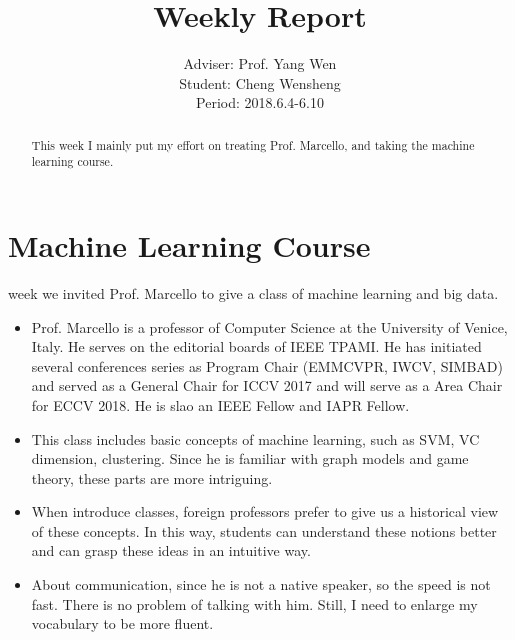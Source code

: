 \documentclass[]{IEEEtran}
\begin{document}
	\title{Weekly Report}
	\author{Adviser: Prof. Yang Wen \\Student: Cheng Wensheng\\ Period: 2018.6.4-6.10
	}
	\maketitle

\begin{abstract}
	This week I mainly put my effort on treating Prof. Marcello, and taking the machine learning course.
\end{abstract}

\section{Machine Learning Course}
	 week we invited Prof. Marcello to give a class of machine learning and big data.
	\begin{itemize}
		\item Prof. Marcello is a professor of Computer Science at the University of Venice, Italy. He serves on the editorial boards of IEEE TPAMI. He has initiated several conferences series as Program Chair (EMMCVPR, IWCV, SIMBAD) and served as a General Chair for ICCV 2017 and will serve as a Area Chair for ECCV 2018. He is slao an IEEE Fellow and IAPR Fellow.
		\item This class includes basic concepts of machine learning, such as SVM, VC dimension, clustering. Since he is familiar with graph models and game theory, these parts are more intriguing.
		\item When introduce classes, foreign professors prefer to give us a historical view of these concepts. In this way, students can understand these notions better and can grasp these ideas in an intuitive way.
		\item About communication, since he is not a native speaker, so the speed is not fast. There is no problem of talking with him. Still, I need to enlarge my vocabulary to be more fluent.
	\end{itemize}
\end{document}
